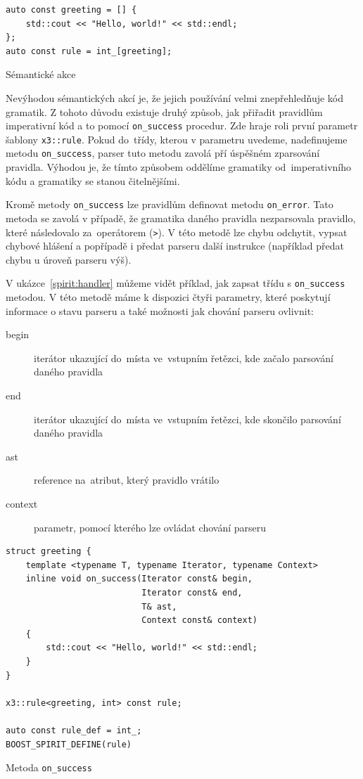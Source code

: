 \documentclass[thesis=B,czech,hidelinks]{FITthesis}[2019/03/06]
\begin{document}
\begin{listing}
\begin{verbatim}
auto const greeting = [] {
    std::cout << "Hello, world!" << std::endl;
};
auto const rule = int_[greeting];
\end{verbatim}
\caption{Sémantické akce}\label{spirit:semantic}
\end{listing}

Nevýhodou sémantických akcí je, že jejich používání velmi znepřehledňuje kód gramatik. Z tohoto důvodu existuje druhý způsob, jak přiřadit pravidlům imperativní kód a to pomocí \verb¨on_success¨ procedur. Zde hraje roli první parametr šablony \texttt{x3::rule}. Pokud do~třídy, kterou v parametru uvedeme, nadefinujeme metodu \verb¨on_success¨, parser tuto metodu zavolá pří úspěšném zparsování pravidla. Výhodou je, že tímto způsobem oddělíme gramatiky od~imperativního kódu a gramatiky se stanou čitelnějšími.

Kromě metody \verb¨on_success¨ lze pravidlům definovat metodu \verb¨on_error¨. Tato metoda se zavolá v případě, že gramatika daného pravidla nezparsovala pravidlo, které následovalo za~operátorem  (\texttt{>}). V této metodě lze chybu odchytit, vypsat chybové hlášení a popřípadě i předat parseru další instrukce (například předat chybu u úroveň parseru výš).

V ukázce~\ref{spirit:handler} můžeme vidět příklad, jak zapsat třídu s \verb¨on_success¨ metodou. V této metodě máme k dispozici čtyři parametry, které poskytují informace o stavu parseru a také možnosti jak chování parseru ovlivnit:
\begin{description}
    \item[begin]{iterátor ukazující do~místa ve~vstupním řetězci, kde začalo parsování daného pravidla}
    \item[end]{iterátor ukazující do~místa ve~vstupním řetězci, kde skončilo parsování daného pravidla}
    \item[ast]{reference na~atribut, který pravidlo vrátilo}
    \item[context]{parametr, pomocí kterého lze ovládat chování parseru}
\end{description}

\begin{listing}
\begin{verbatim}
struct greeting {
    template <typename T, typename Iterator, typename Context>
    inline void on_success(Iterator const& begin,
                           Iterator const& end,
                           T& ast,
                           Context const& context)
    {
        std::cout << "Hello, world!" << std::endl;
    }
}

x3::rule<greeting, int> const rule;

auto const rule_def = int_;
BOOST_SPIRIT_DEFINE(rule)
\end{verbatim}
\caption{Metoda \texttt{on\_success}}\label{spirit:handler}
\end{listing}
\end{document}

